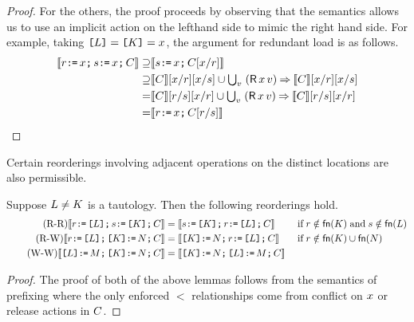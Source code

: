\begin{lemma}
\begin{proof}
  For the others, the proof proceeds by observing that the semantics allows us
  to use an implicit action on the lefthand side to mimic the right hand side.
  For example, taking $\texttt{[}L\texttt{]}=\texttt{[}K\texttt{]}=x$, the argument for
  redundant load is as follows.
  \begin{align*}
    \sem{\aReg \GETS \aLoc \SEMI \bReg \GETS \aLoc  \SEMI \aCmd} 
    \supseteq&  \sem{ \bReg  \GETS \aLoc \SEMI \aCmd[\aLoc/\aReg]} \\
    \supseteq&  \sem{\aCmd}[\aLoc/\aReg][\aLoc/\bReg] \cup  \textstyle\bigcup_\aVal\;  (\DR\aLoc\aVal) \prefix \sem{\aCmd}[\aLoc/\aReg][\aLoc/\bReg]\\
    =& \sem{\aCmd}[\aReg/ \bReg][\aLoc/\aReg] \cup  \textstyle\bigcup_\aVal\;  (\DR\aLoc\aVal) \prefix \sem{\aCmd}[\aReg/ \bReg][\aLoc/\aReg]\\
    =& \sem{\aReg \GETS \aLoc\SEMI \aCmd[\aReg/\bReg]}
    \tag*{\qedhere}
  \end{align*}
\end{proof}
\end{lemma}
  
Certain reorderings involving adjacent operations on the distinct locations
are also permissible. 

\begin{lemma}%
  Suppose $L\neq K$ is a tautology.  Then the following reorderings hold.
  \begin{align*}
    \tag{R-R}
    \llbracket r \texttt{:}\mkern-1mu\texttt{=}\, \texttt{[}L\texttt{]} \texttt{;}\, s \texttt{:}\mkern-1mu\texttt{=}\, \texttt{[}K\texttt{]} \texttt{;}\, C\rrbracket &=
    \llbracket s \texttt{:}\mkern-1mu\texttt{=}\, \texttt{[}K\texttt{]} \texttt{;}\, r \texttt{:}\mkern-1mu\texttt{=}\, \texttt{[}L\texttt{]} \texttt{;}\, C\rrbracket
    &&\;\allowbreak\text{if}\allowbreak\; r\notin\mathsf{fn}(K) \;\allowbreak\text{and}\allowbreak\; s\notin\mathsf{fn}(L)
    \\
    \tag{R-W}
    \llbracket r \texttt{:}\mkern-1mu\texttt{=}\, \texttt{[}L\texttt{]} \texttt{;}\, \texttt{[}K\texttt{]} \texttt{:}\mkern-1mu\texttt{=}\, N \texttt{;}\, C\rrbracket &=
    \llbracket\texttt{[}K\texttt{]} \texttt{:}\mkern-1mu\texttt{=}\, N \texttt{;}\, r \texttt{:}\mkern-1mu\texttt{=}\, \texttt{[}L\texttt{]} \texttt{;}\, C\rrbracket
    &&\;\allowbreak\text{if}\allowbreak\; r\notin\mathsf{fn}(K) \cup\mathsf{fn}(N)
    \\
    \tag{W-W}
    \llbracket\texttt{[}L\texttt{]} \texttt{:}\mkern-1mu\texttt{=}\, M \texttt{;}\, \texttt{[}K\texttt{]} \texttt{:}\mkern-1mu\texttt{=}\, N \texttt{;}\, C\rrbracket &=
    \llbracket\texttt{[}K\texttt{]} \texttt{:}\mkern-1mu\texttt{=}\, N \texttt{;}\, \texttt{[}L\texttt{]} \texttt{:}\mkern-1mu\texttt{=}\, M \texttt{;}\, C\rrbracket
  \end{align*}
\begin{proof}
The proof of both of the above lemmas follows from the semantics of prefixing where the only enforced $\lt$ relationships come from conflict on $x$ or release actions in $C$.
\end{proof}
\end{lemma}

